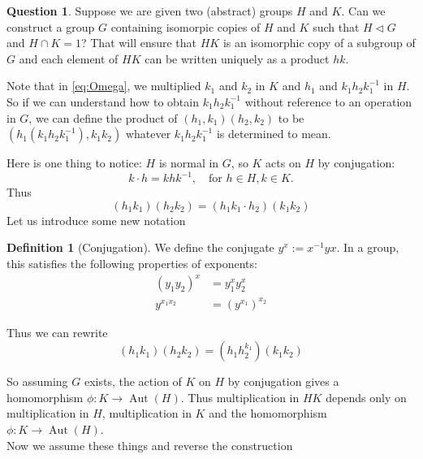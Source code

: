 \documentclass[reqno]{amsart}
\theoremstyle{definition}
\newtheorem{definition}[theorem]{Definition}
\newtheorem{question}[theorem]{Question}
\theoremstyle{remark}
\DeclareMathOperator{\Aut}{Aut}
\begin{document}
\begin{question}
    Suppose we are given  two (abstract) groups $H$ and $K$.
    Can we construct a group $G$ containing isomorpic copies of
    $H$ and $K$ such that $H \triangleleft G$ and
    $H \cap K = 1$? That will ensure that $HK$ is an isomorphic copy of 
    a subgroup of $G$ and
    each element of $HK$ can be written uniquely as a product $hk$.
\end{question}

Note that in \eqref{eq:Omega}, we  multiplied $k_1$ and $k_2$ in $K$ and
$h_1$ and $k_1h_2k_1^{-1}$ in $H$. So if we can understand how to obtain
$k_1 h_2 k_1^{-1}$ without reference to an operation in $G$, we can define
the product of $\left( h_1,  k_1 \right) \left( h_2 ,k_2 \right) $ to
be $\left( h_1 \left( k_1 h_2 k_1^{-1} \right) , k_1k_2 \right)$ whatever
$k_1 h_2 k_1^{-1}$ is determined to mean.

Here is one thing to notice: $H$ is normal in $G$, so $K$ acts on $H$ by
conjugation:
\[
k \cdot  h = k h k^{-1}, \quad \text{for } h \in H, k \in K.
\] 
Thus
\[
    \left( h_1 k_1 \right) \left( h_2 k_2 \right) =
    \left( h_1 k_1 \cdot  h_2 \right) \left( k_1 k_2 \right) 
\] 
Let us introduce some new notation

\begin{definition}[Conjugation]
    We define the conjugate $y^{x} := x^{-1} y x$.
    In a group, this satisfies the following properties of exponents:
    \begin{align*}
        \left( y_1 y_2 \right)^{x} &= y_1^{x} y_2^{x}\\
        y^{x_1 x_2} &= \left( y^{x_1} \right)^{x_2}
    \end{align*}
\end{definition}

Thus we can rewrite
\[
    \left( h_1 k_1 \right) \left( h_2k_2 \right) 
    = \left( h_1 h_2^{k_1} \right) \left( k_1 k_2 \right) 
\] 

So assuming $G$ exists, the action of $K$ on $H$ by conjugation gives
a homomorphism $\phi \colon K \to \Aut (H)$. Thus multiplication in $HK$
depends only on multiplication in $H$, multiplication in $K$ and the
homomorphism $\phi \colon K \to \Aut(H)$.\\
\linebreak
Now we assume these things and reverse the construction
\end{document}
